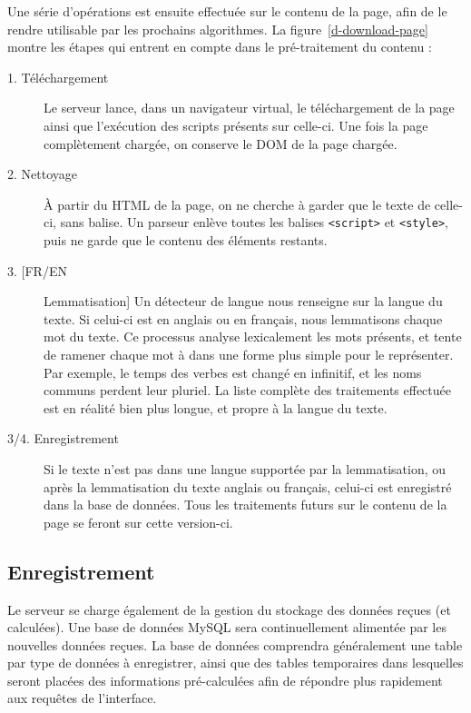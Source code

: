 			Une série d'opérations est ensuite effectuée sur le contenu de la page, afin de le rendre utilisable par les prochains algorithmes. La figure~\ref{d-download-page} montre les étapes qui entrent en compte dans le pré-traitement du contenu :

			\begin{description}
				\item[1. Téléchargement] Le serveur lance, dans un navigateur virtual, le téléchargement de la page ainsi que l'exécution des scripts présents sur celle-ci. Une fois la page complètement chargée, on conserve le DOM de la page chargée.
				\item[2. Nettoyage] À partir du HTML de la page, on ne cherche à garder que le texte de celle-ci, sans balise. Un parseur enlève toutes les balises \texttt{<script>} et \texttt{<style>}, puis ne garde que le contenu des éléments restants.
				\item[3. [FR/EN] Lemmatisation] Un détecteur de langue nous renseigne sur la langue du texte. Si celui-ci est en anglais ou en français, nous lemmatisons chaque mot du texte. Ce processus analyse lexicalement les mots présents, et tente de ramener chaque mot à dans une forme plus simple pour le représenter. Par exemple, le temps des verbes est changé en infinitif, et les noms communs perdent leur pluriel. La liste complète des traitements effectuée est en réalité bien plus longue, et propre à la langue du texte.
				\item[3/4. Enregistrement] Si le texte n'est pas dans une langue supportée par la lemmatisation, ou après la lemmatisation du texte anglais ou français, celui-ci est enregistré dans la base de données. Tous les traitements futurs sur le contenu de la page se feront sur cette version-ci.
			\end{description}

	\subsection{Enregistrement}

		Le serveur se charge également de la gestion du stockage des données reçues (et calculées). Une base de données MySQL sera continuellement alimentée par les nouvelles données reçues. La base de données comprendra généralement une table par type de données à enregistrer, ainsi que des tables temporaires dans lesquelles seront placées des informations pré-calculées afin de répondre plus rapidement aux requêtes de l'interface.

